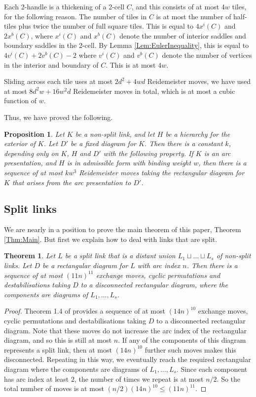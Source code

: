 \documentclass[oneside]{amsart}
\numberwithin{equation}{section}
\theoremstyle{plain}
\newtheorem{theorem}[equation]{Theorem}
\newtheorem{proposition}[equation]{Proposition}
\theoremstyle{definition}
\begin{document}
Each 2-handle is a thickening of a 2-cell $C$, and this consists of at most $4w$ tiles, for the following
reason. The number of tiles in $C$ is at most the number of half-tiles plus twice the number of 
full square tiles. This is equal to $4x^i(C)$ and $2x^b(C)$, where $x^i(C)$ and $x^b(C)$ denote the number of
interior saddles and boundary saddles in the 2-cell. By Lemma \ref{Lem:EulerInequality},
this is equal to $4v^i(C) + 2v^b(C)  - 2$ where $v^i(C)$ and $v^b(C)$ denote the number
of vertices in the interior and boundary of $C$. This is at most $4w$.

Sliding across each tile uses at most $2d^2 + 4wd$ Reidemeister
moves, we have used at most $8d^2 w+ 16 w^2 d$ Reidemeister moves in total, which is at most a cubic function of $w$.

Thus, we have proved the following.

\begin{proposition} 
\label{Prop:ReidemeisterMovesToFixed}
Let $K$ be a non-split link, and let $H$ be a hierarchy
for the exterior of $K$. Let $D'$ be a fixed diagram for $K$.
Then there is a constant $k$, depending only on $K$, $H$ and $D'$
with the following property. If $K$ is an arc presentation, and $H$ is in admissible
form with binding weight $w$, then there is a sequence of at most
$kw^3$ Reidemeister moves taking the rectangular diagram for $K$ that
arises from the arc presentation to $D'$.
\end{proposition}

\subsection{Split links}
We are nearly in a position to prove the main theorem of this paper, Theorem \ref{Thm:Main}. But first we explain how to deal with
links that are split.

\begin{theorem}
\label{Thm:Split}
Let $L$ be a split link that is a distant union $L_1 \sqcup \dots \sqcup L_s$ of non-split links. Let $D$ be a rectangular diagram for $L$
with arc index $n$. Then there is a sequence of at most $(11n)^{11}$ exchange moves, cyclic permutations and destabilisations taking $D$
to a disconnected rectangular diagram, where the components are diagrams of $L_1, \dots, L_s$.
\end{theorem}

\begin{proof}
Theorem 1.4 of \cite{Lackenby:PolyUnknot} provides a sequence of at most $(14n)^{10}$ exchange moves, cyclic permutations and destabilisations taking $D$
to a disconnected rectangular diagram. Note that these moves do not increase the arc index of the rectangular diagram, and so this is still at most $n$. 
If any of the components of this diagram represents a split link, then at most $(14n)^{10}$ further such moves makes this disconnected.
Repeating in this way, we eventually reach the required rectangular diagram where the components are diagrams of $L_1, \dots, L_s$.
Since each component has arc index at least $2$, the number of times we repeat is at most $n/2$. So the total number of moves
is at most $(n/2)(14n)^{10} \leq (11n)^{11}$.
\end{proof}
\end{document}
